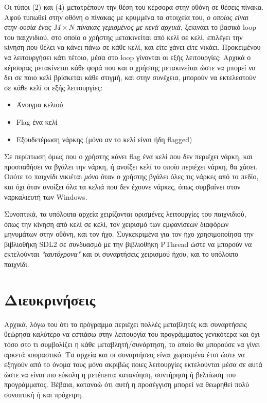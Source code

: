 \documentclass{article}
\begin{document}
    Οι τύποι (2) και (4) μετατρέπουν την θέση του κέρσορα στην οθόνη σε θέσεις πίνακα.    
    Αφού τυπωθεί στην οθόνη ο πίνακας με κρυμμένα τα στοιχεία του, \textit{ο οποίος είναι στην ουσία ένας 
    $Μ \times N$ πίνακας γεμισμένος με κενά αρχικά}, ξεκινάει το βασικό loop του παιχνιδιού, στο οποίο
    ο χρήστης μετακινείται από κελί σε κελί, επιλέγει την κίνηση που θέλει να κάνει πάνω σε κάθε κελί,
    και είτε χάνει είτε νικάει. Προκειμένου να λειτουργήσει κάτι τέτοιο, μέσα στο loop γίνονται οι εξής
    λειτουργίες: Αρχικά ο κέρσορας μετακίνεται κάθε φορά που και ο χρήστης μετακινείται ώστε να μπορεί να δει 
    σε ποιο κελί βρίσκεται κάθε στιγμή, και στην συνέχεια, μπορούν να εκτελεστούν σε κάθε κελί οι εξής λειτουργίες:
    \begin{itemize}
        \item Άνοιγμα κελιού
        \item Flag ένα κελί
        \item Εξουδετέρωση νάρκης (μόνο αν το κελί είναι ήδη flagged)
    \end{itemize}
    Σε περίπτωση όμως που ο χρήστης κάνει flag ένα κελί που δεν περιέχει νάρκη, και προσπαθήσει να βγάλει την νάρκη,
    ή ανοίξει κελί το οποίο περιέχει νάρκη, θα χάσει. Οπότε το παιχνίδι νικιέται \textit{μόνο} όταν ο χρήστης βγάλει 
    όλες τις νάρκες από το πεδίο, και όχι όταν ανοίξει όλα τα κελιά που δεν έχουνε νάρκες, όπως συμβαίνει στον ναρκαλιευτή των Windows.  

    Συνοπτικά, τα υπόλοιπα αρχεία χειρίζονται ορισμένες λειτουργίες του παιχνιδιού, όπως την κίνηση από κελί σε κελί,
    τον χειρισμό των εμφανίσεων διαφόρων μηνυμάτων στην οθόνη, και τον ήχο. Συγκεκριμένα για τον ήχο χρησιμοποίησα την
    βιβλιοθήκη SDL2 σε συνδυασμό με την βιβλιοθήκη PThread ώστε να μπορούν να εκτελούνται \textit{"ταυτόχρονα"} και οι
    συναρτήσεις χειρισμού ήχου, και το υπόλοιπο παιχνίδι. 

\section{Διευκρινήσεις}

    Αρχικά, λόγω του ότι το πρόγραμμα περιέχει πολλές μεταβλητές και συναρτήσεις θεώρησα καλύτερο να εστιάσω στην λειτουργία 
    του προγράμματος γενικότερα και όχι τόσο στο τι συμβολίζει η κάθε μεταβλητή/συνάρτηση, το οποίο θα μπορούσε
    να γίνει αρκετά κουραστικό. Τα αρχεία και οι συναρτήσεις είναι χωρισμένα έτσι ώστε να εξηγούν από το όνομα τους μόνο ακριβώς ποιες λειτουργίες
    εκτελούνται μέσα σε αυτά ώστε να είναι πιο εύκολη η μετέπειτα κατανόηση, συντήρηση ή βελτίωση του προγράμματος. Bέβαια, κατανοώ ότι
    αυτή η προσέγγιση μπορεί να θεωρηθεί πολύ συνοπτική ή και πρόχειρη.  
\end{document}
